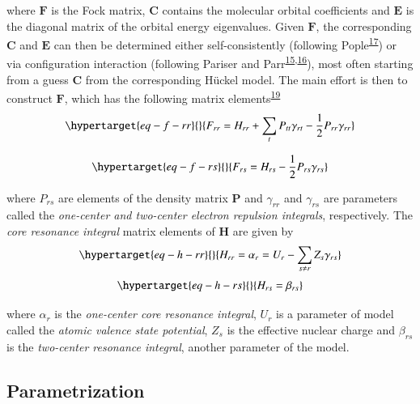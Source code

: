 \documentclass[
  number,
  3p]{elsarticle}
\begin{document}
where \(\mathbf{F}\) is the Fock matrix, \(\mathbf{C}\) contains the
molecular orbital coefficients and \(\mathbf{E}\) is the diagonal matrix
of the orbital energy eigenvalues. Given \(\mathbf{F}\), the
corresponding \(\mathbf{C}\) and \(\mathbf{E}\) can then be determined
either self-consistently (following
Pople\textsuperscript{\protect\hyperlink{ref-popleElectronInteractionUnsaturated1953}{17}})
or via configuration interaction (following Pariser and
Parr\textsuperscript{\protect\hyperlink{ref-pariserSemiEmpiricalTheory1953a}{15},\protect\hyperlink{ref-pariserSemiEmpiricalTheory1953}{16}}),
most often starting from a guess \(\mathbf{C}\) from the corresponding
Hückel model. The main effort is then to construct \(\mathbf{F}\), which
has the following matrix
elements\textsuperscript{\protect\hyperlink{ref-beveridgeParametrizationSemiempiricalPi1971}{19}}
\begin{equation}\protect\hypertarget{eq-f-rr}{}{
F_{rr} = H_{rr} + \sum_{t} P_{tt} \gamma_{rt} - \frac{1}{2} P_{rr} \gamma_{rr} 
}\label{eq-f-rr}\end{equation}

\begin{equation}\protect\hypertarget{eq-f-rs}{}{
F_{rs} = H_{rs} - \frac{1}{2} P_{rs} \gamma_{rs}
}\label{eq-f-rs}\end{equation}

where \(P_{rs}\) are elements of the density matrix \(\mathbf{P}\) and
\(\gamma_{rr}\) and \(\gamma_{rs}\) are parameters called the
\emph{one-center and two-center electron repulsion integrals},
respectively. The \emph{core resonance integral} matrix elements of
\(\mathbf{H}\) are given by
\begin{equation}\protect\hypertarget{eq-h-rr}{}{
H_{rr} = \alpha_r = U_r - \sum_{s \neq r} Z_s \gamma_{rs}
}\label{eq-h-rr}\end{equation}
\begin{equation}\protect\hypertarget{eq-h-rs}{}{
H_{rs} = \beta_{rs}
}\label{eq-h-rs}\end{equation}

where \(\alpha_{r}\) is the \emph{one-center core resonance integral},
\(U_r\) is a parameter of model called the \emph{atomic valence state
potential}, \(Z_s\) is the effective nuclear charge and \(\beta_{rs}\)
is the \emph{two-center resonance integral}, another parameter of the
model.

\hypertarget{parametrization}{%
\subsection{Parametrization}\label{parametrization}}
\end{document}
